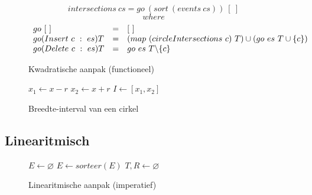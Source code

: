 \begin{figure}
\[
intersections\ cs = go\ (sort\ (events\ cs))\ [\ ]
\]
\[
where 
\]
\[
\begin{array}{l c l}
go\ [\ ] &= &[\ ]\\
go (Insert\ c\ :\ es) T &= &(map\ (circleIntersections\ c)\ T) \cup (go\ es\ T\cup\{c\})\\
go (Delete\ c\ :\ es) T &= &go\ es\ T\backslash\{c\}\\
\end{array}
\]
\label{naief_functioneel}
\caption{Kwadratische aanpak (functioneel)}
\end{figure}

\begin{figure}
  \begin{algorithm}[H]
    $x_1 \leftarrow x - r$\;
    $x_2 \leftarrow x + r$\;
    $I \leftarrow [x_1, x_2]$\;
    \caption{Breedte-interval van een cirkel}
  \end{algorithm}
  \label{algo:interval}
\end{figure}

\subsection{Linearitmisch}
\label{sec:linearitmisch}
\begin{figure}
  \begin{algorithm}[H]
    $E \leftarrow \varnothing$\;
    $E \leftarrow sorteer(E)$\;
    $T, R \leftarrow \varnothing$\;
    \caption{Linearitmische aanpak (imperatief)}
  \end{algorithm}
\end{figure}
